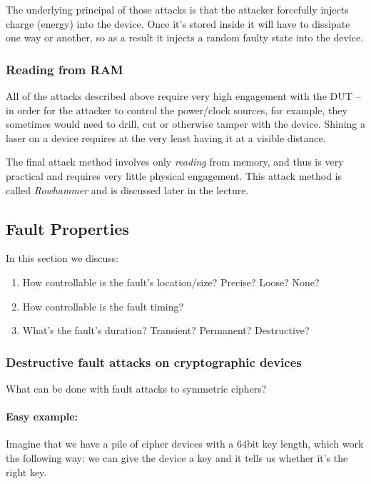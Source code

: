 The underlying principal of those attacks is that the attacker forcefully injects charge (energy) into the device. Once it's stored inside it will have to dissipate one way or another, so as a result it injects a random faulty state into the device.

\subsubsection{Reading from RAM} \label{subsubsec:reading_from_ram}
All of the attacks described above require very high engagement with the DUT -- in order for the attacker to control the power/clock sources, for example, they sometimes would need to drill, cut or otherwise tamper with the device. Shining a laser on a device requires at the very least having it at a visible distance.

The final attack method involves only \emph{reading} from memory, and thus is very practical and requires very little physical engagement. This attack method is called \emph{Rowhammer} and is discussed later in the lecture.


\subsection{Fault Properties} \label{subsec:fault_properties}
In this section we discuss:
\begin{enumerate}
	\item How controllable is the fault's location/size? Precise? Loose? None?
	\item How controllable is the fault timing?
	\item What's the fault's duration? Transient? Permanent? Destructive?
\end{enumerate}


\subsubsection*{Destructive fault attacks on cryptographic devices} \label{subsubsec:destructive_fault_attacks_on_cryptographic_devices}
What can be done with fault attacks to symmetric ciphers?
\paragraph{Easy example:} Imagine that we have a pile of cipher devices with a 64bit key length, which work the following way: we can give the device a key and it tells us whether it's the right key.

